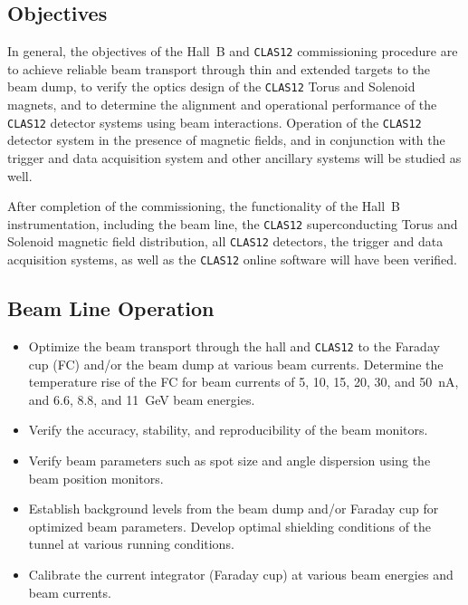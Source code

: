\subsection{Objectives}

In general, the objectives of the Hall~B and {\tt CLAS12} commissioning 
procedure are to achieve reliable beam transport through thin and extended 
targets to the beam dump, to verify the optics design of the {\tt CLAS12} 
Torus and Solenoid magnets, and to determine the alignment and operational 
performance of the {\tt CLAS12} detector systems using beam interactions.  
Operation of the {\tt CLAS12} detector system in the presence of magnetic 
fields, and in conjunction with the trigger and data acquisition system and 
other ancillary systems will be studied as well. 

After completion of the commissioning, the functionality of the Hall~B 
instrumentation, including the beam line, the {\tt CLAS12} superconducting 
Torus and Solenoid magnetic field distribution, all {\tt CLAS12} detectors, 
the trigger and data acquisition systems, as well as the {\tt CLAS12} online 
software will have been verified.  

\subsection{Beam Line Operation}

\begin{itemize}

\item Optimize the beam transport through the hall and {\tt CLAS12} to the 
Faraday cup (FC) and/or the beam dump at various beam currents.  Determine 
the temperature rise of the FC for beam currents of 5, 10, 15, 20, 30, and
50~nA, and 6.6, 8.8, and 11~GeV beam energies.

\item Verify the accuracy, stability, and reproducibility of the beam monitors.

\item Verify beam parameters such as spot size and angle dispersion using 
the beam position monitors.

\item Establish background levels from the beam dump and/or Faraday cup for 
optimized beam parameters.  Develop optimal shielding conditions of the 
tunnel at various running conditions.

\item Calibrate the current integrator (Faraday cup) at various beam energies 
and beam currents. 

\end{itemize}

